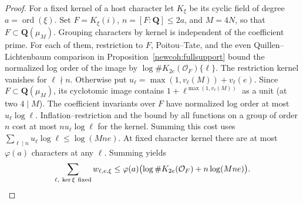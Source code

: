 \begin{proof}
For a fixed kernel of a host character let \(K_\xi\) be its cyclic
field of degree \(a=\operatorname{ord}(\xi)\). Set \(F=K_\xi(i)\),
\(n=[F:\mathbf Q]\le2a\), and \(M=4N\), so that
\(F\subset\mathbf Q(\mu_M)\). Grouping characters by kernel is
independent of the coefficient prime. For each of them, restriction
to \(F\), Poitou--Tate, and the even Quillen--Lichtenbaum comparison
in Proposition~\ref{newcoh:fullsupport} bound the normalized log
order of the image by \(\log\# K_{2e}(\mathcal O_F)\{\ell\}\).
The restriction kernel vanishes for \(\ell\nmid n\). Otherwise
put \(u_\ell=\max(1,v_\ell(M))+v_\ell(e)\).
Since \(F\subset\mathbf Q(\mu_M)\), its cyclotomic image contains
\(1+\ell^{\max(1,v_\ell(M))}\) as a unit (at two \(4\mid M\)).
The coefficient invariants over \(F\) have normalized log order
at most \(u_\ell\log\ell\). Inflation--restriction and the bound
by all functions on a group of order \(n\) cost at most
\(n u_\ell\log\ell\) for the kernel. Summing this cost uses
\(\sum_{\ell\mid n}u_\ell\log\ell\le\log(Mne)\).
At fixed character kernel there are
at most \(\varphi(a)\) characters at any \(\ell\). Summing yields
\[
 \sum_{\ell,\ \ker\xi\ {\rm fixed}} w_{\ell,e,\xi}
 \le\varphi(a)
       \bigl(\log\#K_{2e}(\mathcal O_F)+n\log(Mne)\bigr).
\]


\end{proof}
